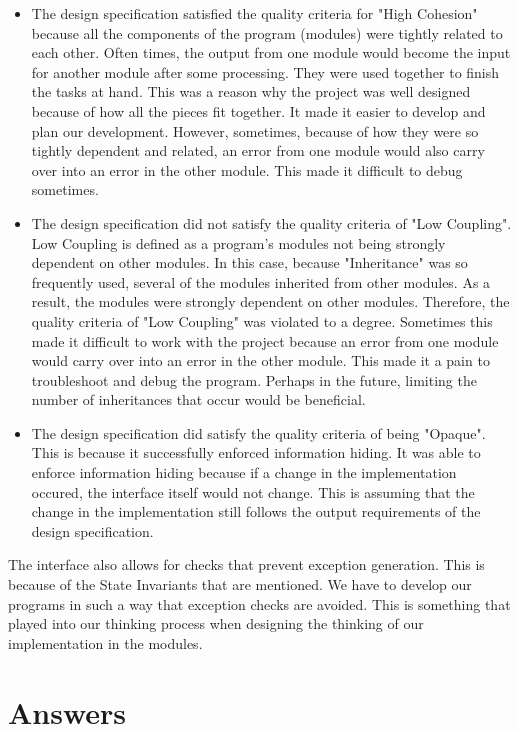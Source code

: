 \documentclass[12pt]{article}
\begin{document}
\begin{itemize}
  \item The design specification satisfied the quality criteria for "High Cohesion" because all the components of the program (modules) were tightly related to each other. Often times, the output from
  one module would become the input for another module after some processing. They were used together to finish the tasks at hand. This was a reason why the project was well designed because of how all the pieces
  fit together. It made it easier to develop and plan our development. However, sometimes, because of how they were so tightly dependent and related, an error from one module would also carry over into an error in the other
  module. This made it difficult to debug sometimes.

  \item The design specification did not satisfy the quality criteria of "Low Coupling". Low Coupling is defined as a program's modules not being strongly 
  dependent on other modules. In this case, because "Inheritance" was so frequently used, several of the modules inherited from other modules. As a result,
  the modules were strongly dependent on other modules. Therefore, the quality criteria of "Low Coupling" was violated to a degree. Sometimes this made it difficult to work with the project
  because an error from one module would carry over into an error in the other module. This made it a pain to troubleshoot and debug the program. Perhaps in the future, limiting the number of 
  inheritances that occur would be beneficial.

  \item The design specification did satisfy the quality criteria of being "Opaque". This is because it successfully enforced information hiding. It was able to
  enforce information hiding because if a change in the implementation occured, the interface itself would not change. This is assuming that the change in the implementation
  still follows the output requirements of the design specification. 
\end{itemize}

The interface also allows for checks that prevent exception generation. This is because of the State Invariants that are mentioned. We have to develop our programs in such a way that exception checks are avoided.
This is something that played into our thinking process when designing the thinking of our implementation in the modules. 
\section{Answers}
\end{document}
